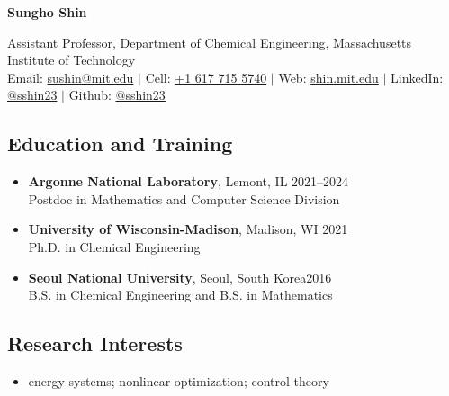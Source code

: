 \documentclass[letterpaper, 11pt]{article}
\begin{document}
\thispagestyle{empty}
\begin{center}
  {\bf\Large Sungho Shin}
\end{center}
\begin{center}
  {Assistant Professor}, Department of Chemical Engineering, {Massachusetts Institute of Technology}\\
  Email: \href{mailto:sushin@mit.edu}{sushin@mit.edu} $|$ Cell: \href{tel:16177155740}{+1 617 715 5740} $|$ Web: \href{https://shin.mit.edu}{shin.mit.edu} $|$ LinkedIn: \href{https://www.linkedin.com/in/sshin23/}{@sshin23} $|$ Github: \href{https://github.com/sshin23}{@sshin23}
\end{center}


\subsection*{Education and Training}
\begin{itemize}[itemsep=1pt, parsep=0pt,leftmargin=*]
\item[]
  {\bf Argonne National Laboratory}, Lemont, IL \hfill 2021--2024\\
  {Postdoc in Mathematics and Computer Science Division}
\item[]
  {\bf University of Wisconsin-Madison}, Madison, WI \hfill 2021\\
  {Ph.D. in Chemical Engineering}
\item[]
  {\bf Seoul National University}, Seoul, South Korea\hfill 2016 \\
  {B.S. in Chemical Engineering} and {B.S. in Mathematics}
\end{itemize}

\subsection*{Research Interests}
\begin{itemize}[leftmargin=*]
\item[] energy systems; nonlinear optimization; control theory
\end{itemize}
\end{document}
